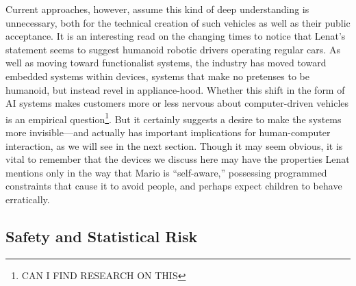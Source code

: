 Current approaches, however, assume this kind of deep understanding is
unnecessary, both for the technical creation of such vehicles as well
as their public acceptance. It is an interesting read on the changing
times to notice that Lenat's statement seems to suggest humanoid
robotic drivers operating regular cars. As well as moving toward
functionalist systems, the industry has moved toward embedded systems
within devices, systems that make no pretenses to be humanoid, but
instead revel in appliance-hood. Whether this shift in the form of AI
systems makes customers more or less nervous about computer-driven
vehicles is an empirical question\footnote{CAN I FIND RESEARCH ON
  THIS}. But it certainly suggests a desire to make the systems more
invisible---and actually has important implications for human-computer
interaction, as we will see in the next section. Though it may seem
obvious, it is vital to remember that the devices we discuss here may
have the properties Lenat mentions only in the way that Mario is
``self-aware,'' possessing programmed constraints that cause it to
avoid people, and perhaps expect children to behave erratically. 


\subsection{Safety and Statistical Risk}

